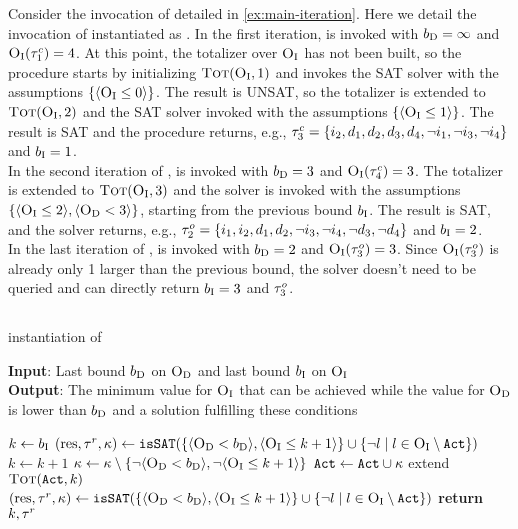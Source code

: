 \begin{example}
  Consider the invocation of \algname{} detailed in \cref{ex:main-iteration}. 
  Here we detail the invocation of \Min{} instantiated as \unsatsat{}.
  In the first iteration, \unsatsat{} is invoked with $b_{\text{D}} =\infty$ and $\textsc{O}_{\text{I}}(\tau^c_1) = 4$.
  At this point, the totalizer over $\textsc{O}_{\text{I}}$ has not been built, so the procedure starts by initializing $\textsc{Tot}(\textsc{O}_{\text{I}}, 1)$ and invokes the SAT solver with the assumptions $\{\langle \textsc{O}_{\text{I}} \leq 0 \rangle\}$.
  The result is UNSAT, so the totalizer is extended to $\textsc{Tot}(\textsc{O}_{\text{I}}, 2)$ and the SAT solver invoked with the assumptions $\{ \langle \textsc{O}_{\text{I}} \leq 1 \rangle\}$.
  The result is SAT and the procedure returns, e.g., $\tau^c_3 = \{i_2,\allowbreak d_1,\allowbreak d_2,\allowbreak d_3,\allowbreak d_4,\allowbreak \lnot i_1,\allowbreak \lnot i_3,\allowbreak \lnot i_4\}$ and $b_{\text{I}} = 1$. \\
  In the second iteration of \algname{}, \unsatsat{} is invoked with $b_{\text{D}} = 3$ and $\textsc{O}_{\text{I}}(\tau^c_4) = 3$.
  The totalizer is extended to $\textsc{Tot}(\textsc{O}_{\text{I}}, 3)$ and the solver is invoked with the assumptions $\{\langle \textsc{O}_{\text{I}} \leq 2 \rangle, \langle \textsc{O}_{\text{D}} < 3 \rangle\}$, starting from the previous bound $b_{\text{I}}$.
  The result is SAT, and the solver returns, e.g., $\tau^o_2 = \{i_1,\allowbreak i_2,\allowbreak d_1,\allowbreak d_2,\allowbreak \lnot i_3,\allowbreak \lnot i_4,\allowbreak \lnot d_3,\allowbreak \lnot d_4\}$ and $b_{\text{I}} = 2$. \\
  In the last iteration of \algname{}, \unsatsat{} is invoked with $b_{\text{D}} = 2$ and $\textsc{O}_{\text{I}}(\tau^o_3) = 3$.
  Since $\textsc{O}_{\text{I}}(\tau^o_3)$ is already only 1 larger than the previous bound, the solver doesn't need to be queried and \unsatsat{} can directly return $b_{\text{I}} = 3$ and $\tau^o_3$.
\end{example}

\subsection{\msu{}\label{sec:msu3}}

\begin{algorithm}[t]
  \caption{\msu{} instantiation of \Min{}}\label{alg:msu3}
  \textbf{Input}: Last bound $b_{\text{D}}$ on $\textsc{O}_{\text{D}}$ and last bound $b_{\text{I}}$ on $\textsc{O}_{\text{I}}$ \\
  \textbf{Output}: The minimum value for $\textsc{O}_{\text{I}}$ that can be achieved while the value for $\textsc{O}_{\text{D}}$ is lower than $b_{\text{D}}$ and a solution fulfilling these conditions

  \begin{algorithmic}[1]
    \STATE $k \gets b_{\text{I}}$
    \STATE $(\text{res},\tau^r,\kappa) \gets \texttt{isSAT}(\{\langle \textsc{O}_{\text{D}} < b_{\text{D}} \rangle, \langle \textsc{O}_{\text{I}} \leq k+1 \rangle\} \cup \{\lnot l \mid l \in \textsc{O}_{\text{I}} \setminus \texttt{Act}\})$
      \STATE $k \gets k+1$
      \STATE $\kappa \gets \kappa \setminus \{\lnot\langle \textsc{O}_{\text{D}} < b_{\text{D}} \rangle, \lnot\langle \textsc{O}_{\text{I}} \leq k+1 \rangle\}$
      \STATE $\texttt{Act} \gets \texttt{Act} \cup \kappa$
      \STATE extend $\textsc{Tot}(\texttt{Act},k)$
      \STATE $(\text{res},\tau^r,\kappa) \gets \texttt{isSAT}(\{\langle \textsc{O}_{\text{D}} < b_{\text{D}} \rangle, \langle \textsc{O}_{\text{I}} \leq k+1 \rangle\} \cup \{\lnot l \mid l \in \textsc{O}_{\text{I}} \setminus \texttt{Act}\})$
    \ENDWHILE
    \STATE \textbf{return} $k,\tau^r$
  \end{algorithmic}
\end{algorithm}

